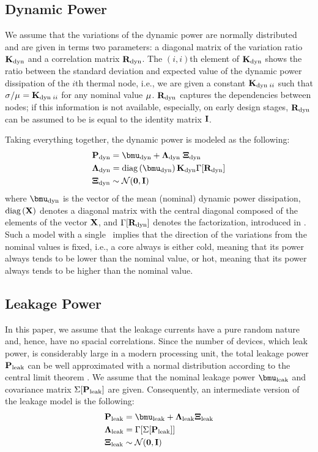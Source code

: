 \subsection{Dynamic Power}
We assume that the variations of the dynamic power are normally distributed and are given in terms two parameters: a diagonal matrix of the variation ratio $\mathbf{K}_{\text{dyn}}$ and a correlation matrix $\mathbf{R}_{\text{dyn}}$. The $(i,i)$th element of $\mathbf{K}_{\text{dyn}}$ shows the ratio between the standard deviation and expected value of the dynamic power dissipation of the $i$th thermal node, i.e., we are given a constant $\mathbf{K}_{\text{dyn} \; ii}$ such that $\sigma_{}/\mu_{} = \mathbf{K}_{\text{dyn} \; ii}$ for any nominal value $\mu_{}$. $\mathbf{R}_{\text{dyn}}$ captures the dependencies between nodes; if this information is not available, especially, on early design stages, $\mathbf{R}_{\text{dyn}}$ can be assumed to be is equal to the identity matrix $\mathbf{I}$.

Taking everything together, the dynamic power is modeled as the following:
\begin{align} \equlabel{dynamic-power}
  & \vpower_\dyn = \vmean{\dyn} + \ddev{\dyn} \; \vnormal_\dyn \\
  & \ddev{\dyn} = \diag{\vmean{\dyn}} \mratio_\dyn \factorize{\mcorr{\dyn}} \nonumber \\
  & \vnormal_\dyn \sim \normal(\vzero, \mone) \nonumber
\end{align}
where $\vmean{\dyn}$ is the vector of the mean (nominal) dynamic power dissipation, $\text{diag}\left(\mathbf{X}\right)$ denotes a diagonal matrix with the central diagonal composed of the elements of the vector $\mathbf{X}$, and $\Gamma[\mathbf{R}_{\text{dyn}}]$ denotes the factorization, introduced in . Such a model with a single \mrv\ implies that the direction of the variations from the nominal values is fixed, i.e., a core always is either cold, meaning that its power always tends to be lower than the nominal value, or hot, meaning that its power always tends to be higher than the nominal value.

\subsection{Leakage Power}
In this paper, we assume that the leakage currents have a pure random nature and, hence, have no spacial correlations. Since the number of devices, which leak power, is considerably large in a modern processing unit, the total leakage power $\mathbf{P}_{\text{leak}}$ can be well approximated with a normal distribution according to the central limit theorem \cite{durrett2010}. We assume that the nominal leakage power $\vmean{\leak}$ and covariance matrix $\Sigma[\mathbf{P}_{\text{leak}}]$ are given. Consequently, an intermediate version of the leakage model is the following:
\begin{align*}
  & \vpower_\leak = \vmean{\leak} + \ddev{\leak} \vnormal_\leak \\
  & \ddev{\leak} = \factorize{\cov{\vpower_\leak}} \\
  & \vnormal_\leak \sim \normal(\vzero, \mone)
\end{align*}

